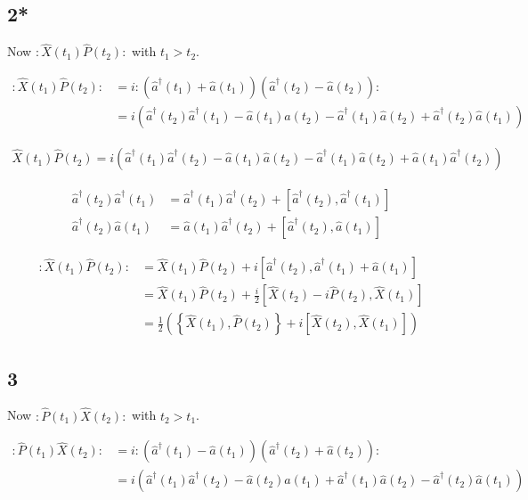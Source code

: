 \documentclass[12pt]{article}
\newcommand{\ahat}{\hat{a}}
\newcommand{\adag}{\ahat^{\dag}}
\begin{document}
\pagebreak

\subsection{2*}

Now $:\hat{X}(t_1)\hat{P}(t_2):$ with $t_1>t_2$.

\begin{align}
:\hat{X}(t_1)\hat{P}(t_2): &= i:(\adag(t_1)+\ahat(t_1))(\adag(t_2)-\ahat(t_2)):\\
&= i(\adag(t_2)\adag(t_1) - \ahat(t_1)\ahat(t_2) - \adag(t_1)\ahat(t_2) + \adag(t_2)\ahat(t_1))
\end{align}

\begin{align}
\hat{X}(t_1)\hat{P}(t_2) = i(\adag(t_1)\adag(t_2) - \ahat(t_1)\ahat(t_2) - \adag(t_1)\ahat(t_2) + \ahat(t_1)\adag(t_2))
\end{align}

\begin{align}
\adag(t_2)\adag(t_1) &= \adag(t_1)\adag(t_2) + \left[\adag(t_2),\adag(t_1)\right]\\
\adag(t_2)\ahat(t_1) &= \ahat(t_1)\adag(t_2) + \left[\adag(t_2),\ahat(t_1)\right]
\end{align}

\begin{align}
:\hat{X}(t_1)\hat{P}(t_2): &= \hat{X}(t_1)\hat{P}(t_2) + i\left[\adag(t_2),\adag(t_1) + \ahat(t_1)\right]\\
&= \hat{X}(t_1)\hat{P}(t_2) + \frac{i}{2} \left[\hat{X}(t_2)-i\hat{P}(t_2),\hat{X}(t_1)\right]\\
&= \frac{1}{2}\left(\left\{\hat{X}(t_1),\hat{P}(t_2)\right\} + i \left[\hat{X}(t_2),\hat{X}(t_1)\right]\right)
\end{align}

\pagebreak

\subsection{3}

Now $:\hat{P}(t_1)\hat{X}(t_2):$ with $t_2>t_1$.

\begin{align}
:\hat{P}(t_1)\hat{X}(t_2): &= i:(\adag(t_1)-\ahat(t_1))(\adag(t_2)+\ahat(t_2)):\\
&= i(\adag(t_1)\adag(t_2) - \ahat(t_2)\ahat(t_1) + \adag(t_1)\ahat(t_2) - \adag(t_2)\ahat(t_1))
\end{align}
\end{document}
